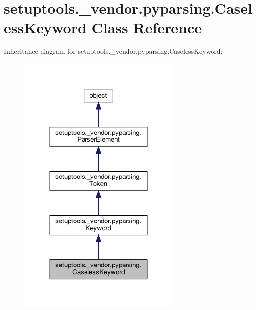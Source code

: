 \hypertarget{classsetuptools_1_1__vendor_1_1pyparsing_1_1CaselessKeyword}{}\section{setuptools.\+\_\+vendor.\+pyparsing.\+Caseless\+Keyword Class Reference}
\label{classsetuptools_1_1__vendor_1_1pyparsing_1_1CaselessKeyword}


Inheritance diagram for setuptools.\+\_\+vendor.\+pyparsing.\+Caseless\+Keyword\+:
\nopagebreak
\begin{figure}[H]
\begin{center}
\leavevmode
\includegraphics[width=227pt]{classsetuptools_1_1__vendor_1_1pyparsing_1_1CaselessKeyword__inherit__graph}
\end{center}
\end{figure}



